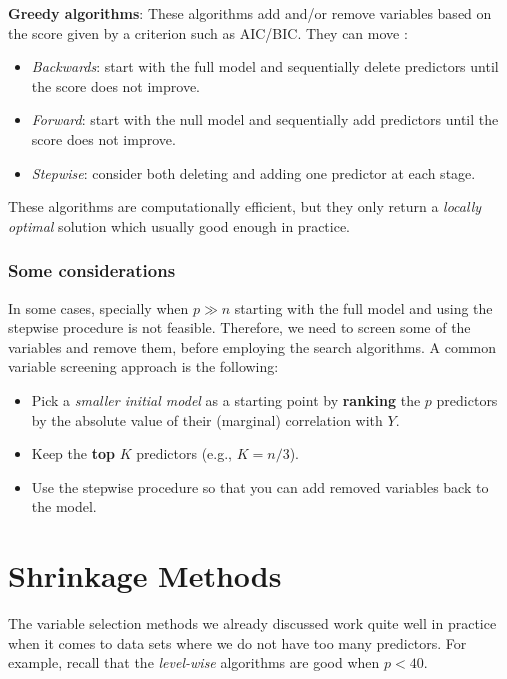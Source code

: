 \documentclass[
]{book}
\begin{document}
\textbf{Greedy algorithms}: These algorithms add and/or remove variables based on the score given by a criterion such as AIC/BIC. They can move :

\begin{itemize}
\item
  \emph{Backwards}: start with the full model and sequentially delete predictors until the score does not improve.
\item
  \emph{Forward}: start with the null model and sequentially add predictors until the score does not improve.
\item
  \emph{Stepwise}: consider both deleting and adding one predictor at each stage.
\end{itemize}

These algorithms are computationally efficient, but they only return a \emph{locally optimal} solution which usually good enough in practice.

\subsubsection*{Some considerations}\label{some-considerations}

In some cases, specially when \(p\gg n\) starting with the full model and using the stepwise procedure is not feasible. Therefore, we need to screen some of the variables and remove them, before employing the search algorithms. A common variable screening approach is the following:

\begin{itemize}
\item
  Pick a \emph{smaller initial model} as a starting point by \textbf{ranking} the \(p\) predictors by the absolute value of their (marginal) correlation with \(Y\).
\item
  Keep the \textbf{top} \(K\) predictors (e.g., \(K = n/3\)).
\item
  Use the stepwise procedure so that you can add removed variables back to the model.
\end{itemize}

\section{Shrinkage Methods}\label{shrinkage-methods}

The variable selection methods we already discussed work quite well in practice when it comes to data sets where we do not have too many predictors. For example, recall that the \emph{level-wise} algorithms are good when \(p<40\).
\end{document}
